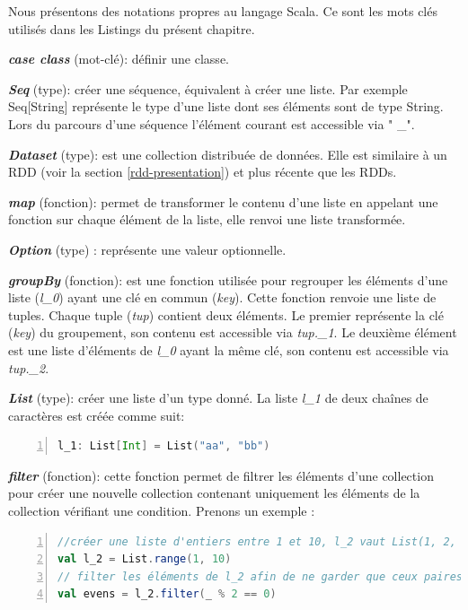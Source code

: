 Nous présentons  des notations   propres au langage Scala. Ce  sont les mots clés utilisés  dans les Listings du présent chapitre. \par
\textbf{\textit{case class}} (mot-clé): définir une  classe.\par
\textit{\textbf{Seq}} (type): créer une séquence, équivalent à créer une liste. Par exemple Seq[String] représente le type d'une liste dont ses éléments sont de type String. Lors du parcours d'une séquence  l'élément courant est accessible via " \_".  \par
\textbf{\textit{Dataset}} (type):  est une collection distribuée de données. Elle est similaire à un RDD (voir la section \ref{rdd-presentation}) et plus récente que les RDDs. \par
\textit{\textbf{map}} (fonction): permet de transformer le contenu d'une liste en appelant une fonction sur chaque élément de la liste, elle renvoi une liste transformée. \par
\textit{\textbf{Option}} (type) : représente une valeur optionnelle.  \par
\textit{\textbf{groupBy}} (fonction):  est une fonction utilisée pour regrouper les éléments d'une liste (\textit{l\_0}) ayant une clé en commun (\textit{key}). Cette fonction renvoie une liste de tuples. Chaque tuple (\textit{tup})  contient deux éléments. Le premier représente la clé (\textit{key})  du groupement, son contenu est accessible via \textit{tup.\_1}. Le deuxième élément est une liste d'éléments de \textit{l\_0} ayant la même clé, son contenu est accessible via \textit{tup.\_2}.\par
\textbf{\textit{List}} (type): créer une liste d'un type donné. La liste \textit{l\_1} de deux chaînes de caractères est créée comme suit:
\begin{lstlisting}[language=scala,firstnumber=1,label={lst:case-class-hop}, basicstyle = \footnotesize,escapechar=|,numbers=left,
stepnumber=1]
l_1: List[Int] = List("aa", "bb")
\end{lstlisting} \par
\noindent \textbf{\textit{filter}} (fonction): cette fonction permet de filtrer les éléments d'une collection pour créer une nouvelle collection contenant uniquement les éléments de la collection   vérifiant une condition. Prenons un  exemple : 
\begin{lstlisting}[language=scala,firstnumber=1, basicstyle = \footnotesize,escapechar=|,numbers=left,
stepnumber=1]
//créer une liste d'entiers entre 1 et 10, l_2 vaut List(1, 2, 3, 4, 5, 6, 7, 8, 9)
val l_2 = List.range(1, 10)   
// filter les éléments de l_2 afin de ne garder que ceux paires, evens vaut List(2, 4, 6, 8)
val evens = l_2.filter(_ % 2 == 0)  
\end{lstlisting} \par

